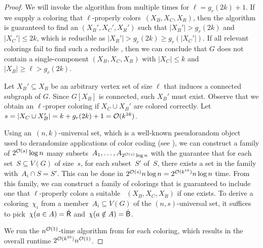 \begin{proof}
  We will invoke the algorithm from  multiple times for $\ell=g_r(2k) + 1$.
  If we supply a coloring that $\ell$-properly colors~$(X_B, X_C, X_R)$, then the algorithm is guaranteed to find an \occ $(X_B', X_C', X_R')$
  such that $|X_B'| > g_r(2k)$ and $|X_C'| \leq 2k$,
  which is reducible as $|X_B'| > g_r(2k) \geq g_r(|X_C'|)$.
  If all relevant colorings fail to find such a reducible \occ,
  then we can conclude that $G$ does not contain a single-component \occ $(X_B, X_C, X_R)$
  with $|X_C| \leq k$ and $|X_B| \geq \ell >g_r(2k)$.

  Let $X_B' \subseteq X_B$ be an arbitrary vertex set of size $\ell$ that induces a connected subgraph of $G$.
  Since $G[X_B]$ is connected, such $X_B'$ must exist.
  Observe that we obtain an $\ell$-proper coloring if $X_C \cup X_B'$ are colored correctly.
  Let $s = |X_C \cup X_B'| = k + g_r(2k) + 1 = \mathcal{O}(k^{16})$.

  Using an~$(n,k)$-universal set, which is a well-known pseudorandom object~\cite{NaorSS95, CyganFKLMPPS15} used to derandomize applications of color coding (see ), we can construct a family of $2^{\mathcal{O}(s)}\log n$ many subsets~$A_1, \ldots, A_{2^{\mathcal{O}(s)} \log n}$ with the guarantee that for each set~$S \subseteq V(G)$ of size~$s$, for each subset~$S'$ of~$S$, there exists a set in the family with~$A_i \cap S = S'$. This can be done in $2^{\mathcal{O}(s)} n \log n = 2^{\mathcal{O}(k^{16})} n \log n$ time. From this family, we can construct a family of colorings that is guaranteed to include one that $\ell$-properly colors a suitable \occ~$(X_B, X_C, X_R)$ if one exists. To derive a coloring~$\chi_i$ from a member~$A_i \subseteq V(G)$ of the $(n,s)$-universal set, it suffices to pick~$\chi(a \in A) = \mathsf{\dot{R}}$ and~$\chi(a \notin A) = \mathsf{\dot{B}}$.

  We run the $n^{\mathcal{O}(1)}$-time algorithm from  for each coloring,
  which results in the overall runtime $2^{\mathcal{O}(k^{16})} n^{\mathcal{O}(1)}$.
\end{proof}
